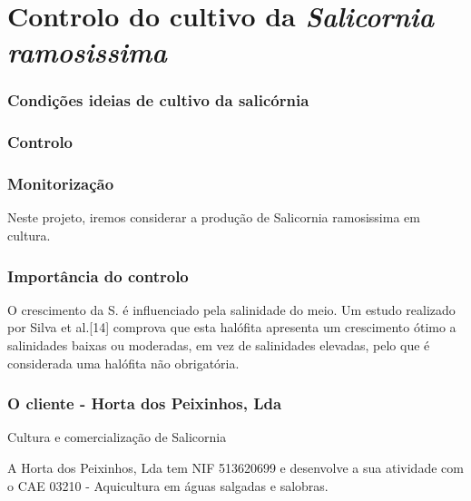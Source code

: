 \chapter{Controlo do cultivo da \textit{Salicornia ramosissima}}

\subsection{Condições ideias de cultivo da salicórnia}

\subsection{Controlo}

\subsection{Monitorização}




Neste projeto, iremos considerar a produção de Salicornia ramosissima em cultura.



\subsection{Importância do controlo}


O crescimento da S.  é influenciado pela salinidade do meio. Um
estudo realizado por Silva et al.[14] comprova que esta halófita apresenta um crescimento
ótimo a salinidades baixas ou moderadas, em vez de salinidades elevadas, pelo que é
considerada uma halófita não obrigatória.


\subsection{O cliente - Horta dos Peixinhos, Lda}


Cultura e comercialização de Salicornia


A Horta dos Peixinhos, Lda tem NIF 513620699 e desenvolve a sua atividade com o CAE 03210 - Aquicultura em águas salgadas e salobras.





\section{}


